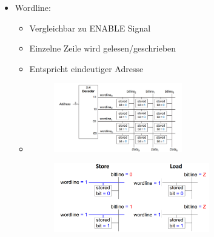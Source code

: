 \documentclass[11pt,a4paper]{article}
\begin{document}
\begin{itemize}
\begin{itemize}
	\item Wordline:
		\begin{itemize}
		\item Vergleichbar zu ENABLE Signal
		\item Einzelne Zeile wird gelesen/geschrieben
		\item Entspricht eindeutiger Adresse
		\item[]
			\begin{minipage}{0.4\textwidth}
				\begin{figure}[H]
				\includegraphics[height=3cm]{Bilder/wordline}
				\end{figure}
			\end{minipage}
			\begin{minipage}[t]{0.45\textwidth}
				\vspace{-1.75cm}
				\begin{figure}[H]
				\includegraphics[height=3cm]{Bilder/wordline2}
				\end{figure}
			\end{minipage}
		\end{itemize}
	\end{itemize}

\pagebreak


\end{itemize}
\end{document}
